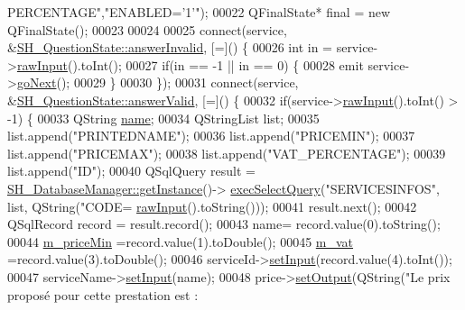 \begin{DoxyCode}
{      PERCENTAGE"},\textcolor{stringliteral}{"ENABLED='1'"});
00022     QFinalState* \textcolor{keyword}{final} = \textcolor{keyword}{new} QFinalState();
00023 
00024 
00025     connect(service, &\hyperlink{classSH__QuestionState_a3348a8a683130678ac87a10ba2a25486}{SH\_QuestionState::answerInvalid}, [=]() \{
00026         \textcolor{keywordtype}{int} in = service->\hyperlink{classSH__DatabaseContentQuestionState_aed9d5e4205ca37d32653475ac13fe097}{rawInput}().toInt();
00027         \textcolor{keywordflow}{if}(in == -1 || in == 0) \{
00028             emit service->\hyperlink{classSH__GenericState_a34c1bebc765cc3a62d66c94c37d4f0c3}{goNext}();
00029         \}
00030     \});
00031     connect(service, &\hyperlink{classSH__QuestionState_a04e259643788d15ab6244bc8a04286d6}{SH\_QuestionState::answerValid}, [=]() \{
00032         \textcolor{keywordflow}{if}(service->\hyperlink{classSH__DatabaseContentQuestionState_aed9d5e4205ca37d32653475ac13fe097}{rawInput}().toInt() > -1) \{
00033             QString \hyperlink{classSH__NamedObject_a9f686c6f2a5bcc08ad03d0cee0151f0f}{name};
00034             QStringList list;
00035             list.append(\textcolor{stringliteral}{"PRINTEDNAME"});
00036             list.append(\textcolor{stringliteral}{"PRICEMIN"});
00037             list.append(\textcolor{stringliteral}{"PRICEMAX"});
00038             list.append(\textcolor{stringliteral}{"VAT\_PERCENTAGE"});
00039             list.append(\textcolor{stringliteral}{"ID"});
00040             QSqlQuery result = \hyperlink{classSH__DatabaseManager_a31198eb4de0f8b18e3fa0eed09f24d19}{SH\_DatabaseManager::getInstance}()->
      \hyperlink{classSH__DatabaseManager_ab8f9850cb68444ab9a4e613b36a3b044}{execSelectQuery}(\textcolor{stringliteral}{"SERVICESINFOS"}, list, QString(\textcolor{stringliteral}{"CODE=%
      \hyperlink{classSH__DatabaseContentQuestionState_aed9d5e4205ca37d32653475ac13fe097}{rawInput}().toString()));
00041             result.next();
00042             QSqlRecord record = result.record();
00043             name= record.value(0).toString();
00044             \hyperlink{classSH__ServiceCharging_a44584a7ff1edd6ae03c4f77544136c13}{m\_priceMin} =record.value(1).toDouble();
00045             \hyperlink{classSH__ServiceCharging_ae2fa75c56883dc4af6b0bbcbb86d0861}{m\_vat} =record.value(3).toDouble();
00046             serviceId->\hyperlink{classSH__InOutState_aaec9c2b5ef7c406bff7469461352d47c}{setInput}(record.value(4).toInt());
00047             serviceName->\hyperlink{classSH__QuestionState_ab40b6202090d1afcc965e124b2deb88a}{setInput}(name);
00048             price->\hyperlink{classSH__InOutState_af611c84134e262739cd834797b315c80}{setOutput}(QString(\textcolor{stringliteral}{"Le prix proposé pour cette prestation est : %
}}
\end{DoxyCode}
